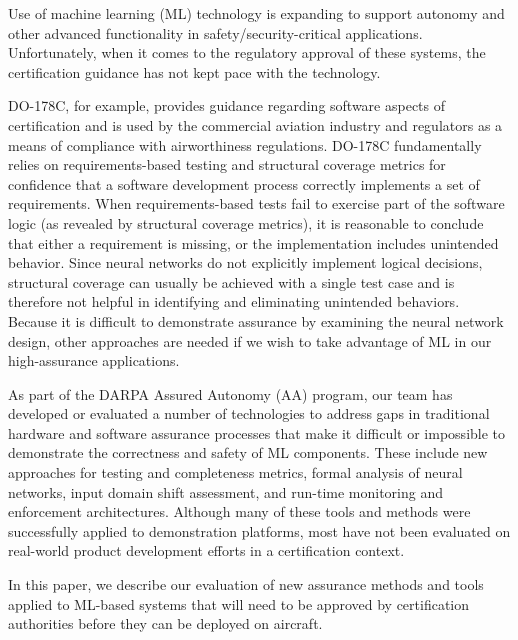 Use of machine learning (ML) technology is expanding to support autonomy and other advanced functionality in safety/security-critical applications.  Unfortunately, when it comes to the regulatory approval of these systems, the certification guidance has not kept pace with the technology.

DO-178C, for example, provides guidance regarding software aspects of certification and is used by the commercial aviation industry and regulators as a means of compliance with airworthiness regulations. DO-178C fundamentally relies on requirements-based testing and structural coverage metrics for confidence that a software development process correctly implements a set of requirements. When requirements-based tests fail to exercise part of the software logic (as revealed by structural coverage metrics), it is reasonable to conclude that either a requirement is missing, or the implementation includes unintended behavior. Since neural networks do not explicitly implement logical decisions, structural coverage can usually be achieved with a single test case and is therefore not helpful in identifying and eliminating unintended behaviors.  Because it is difficult to demonstrate assurance by examining the neural network design, other approaches are needed if we wish to take advantage of ML in our high-assurance applications.

As part of the DARPA Assured Autonomy (AA) program, our team has developed or evaluated a number of technologies to address gaps in traditional hardware and software assurance processes that make it difficult or impossible to demonstrate the correctness and safety of ML components.    These include new approaches for testing and completeness metrics, formal analysis of neural networks, input domain shift assessment, and run-time monitoring and enforcement architectures.  Although many of these tools and methods were successfully applied to demonstration platforms, most have not been evaluated on real-world product development efforts in a certification context. 

In this paper, we describe our evaluation of new assurance methods and tools applied to ML-based systems that will need to be approved by certification authorities before they can be deployed on aircraft.